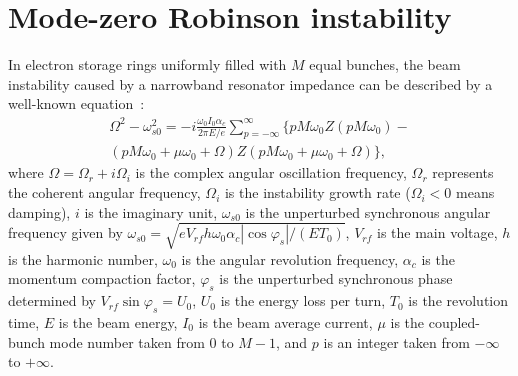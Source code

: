\documentclass[%
 reprint,
 amsmath,amssymb,
 aps,
]{revtex4-1}
\begin{document}
\section{\label{sec:level2} Mode-zero Robinson instability}
In electron storage rings uniformly filled with $M$ equal bunches, the beam instability caused by a narrowband resonator impedance can be described by a well-known equation~\cite{Chao11,KyNg12}:
\begin{equation}\label{eq:labe1}
   \begin{aligned}
   \Omega^2-\omega_{s0}^2 = -i\frac{\omega_0 I_0 \alpha_c}{2\pi E / e}\sum\limits^{\infty}_{p=-\infty}\{pM \omega_0 Z(pM \omega_0)-\\
   (pM \omega_0+\mu \omega_0+\Omega)Z(pM \omega_0+\mu \omega_0+\Omega)\},
    \end{aligned}
\end{equation}
where $\Omega=\Omega_r + i\Omega_i$ is the complex angular oscillation frequency, $\Omega_r$ represents the coherent angular frequency, $\Omega_i$ is the instability growth rate ($\Omega_i<0$ means damping), $i$ is the imaginary unit, $\omega_{s0}$ is the unperturbed synchronous angular frequency given by $\omega_{s0}=\sqrt{eV_{rf} h\omega_0 \alpha_c |\cos\varphi_s|/(ET_0)}$, $V_{rf}$ is the main voltage, $h$ is the harmonic number, $\omega_0$ is the angular revolution frequency, $\alpha_c$ is the momentum compaction factor, $\varphi_s$ is the unperturbed synchronous phase determined by $V_{rf}\sin \varphi_s=U_0$, $U_0$ is the energy loss per turn, $T_0$ is the revolution time, $E$ is the beam energy, $I_0$ is the beam average current, $\mu$ is the coupled-bunch mode number taken from $0$ to $M-1$, and $p$ is an integer taken from $-\infty$ to $+\infty$.
\end{document}
